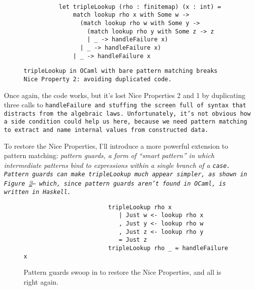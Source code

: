 \documentclass[manuscript,screen,review, 12pt, nonacm]{acmart}
\begin{document}
\begin{outline}[enumerate]
    \begin{figure}[ht]
        \begin{verbatim}

          let tripleLookup (rho : finitemap) (x : int) =
              match lookup rho x with Some w -> 
                (match lookup rho w with Some y -> 
                  (match lookup rho y with Some z -> z
                  | _ -> handleFailure x)
                | _ -> handleFailure x)
              | _ -> handleFailure x
            \end{verbatim}
        \caption{\tt{tripleLookup} in OCaml with bare pattern matching breaks
                    Nice Property 2: avoiding duplicated code. } 
                    
        \label{fig:pmtriplelookup}
    \end{figure}

    Once again, the code works, but it's lost Nice Properties 2 and 1 by
    duplicating three calls to \tt{handleFailure} and stuffing the screen full
    of syntax that distracts from the algebraic laws. Unfortunately, it's not
    obvious how a side condition could help us here, because we need pattern
    matching to extract and name internal values from constructed data.

    To restore the Nice Properties, I'll introduce a more powerful extension to
    pattern matching: \it{pattern guards}, a form of “smart pattern” in which
    intermediate patterns bind to expressions within a single branch of a
    \tt{case}. Pattern guards can make \tt{tripleLookup} \it{much} appear
    simpler, as shown in Figure~\ref{fig:guardtriplelookup}-- which, since
    pattern guards aren't found in OCaml, is written in Haskell.

    \begin{figure}[hbt!]  
        \begin{center}
        \begin{verbatim}
                        tripleLookup rho x
                           | Just w <- lookup rho x
                           , Just y <- lookup rho w
                           , Just z <- lookup rho y
                           = Just z
                        tripleLookup rho _ = handleFailure x
        \end{verbatim}
        \end{center}    
    \caption{Pattern guards swoop in to restore the Nice Properties, and all is
    right again.} 
    \label{fig:guardtriplelookup}
    \end{figure}


\end{outline}
\end{document}
